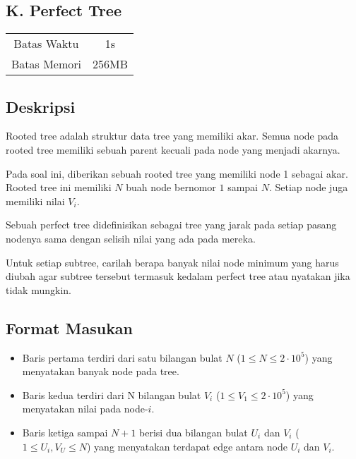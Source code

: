 \documentclass{article}
\begin{document}
\begin{center}
    \section*{K. Perfect Tree} %

    \begin{tabular}{ | c c | }
        \hline
        Batas Waktu  & 1s \\    %
        Batas Memori & 256MB \\  %
        \hline
    \end{tabular}
\end{center}

\subsection*{Deskripsi}

Rooted tree adalah struktur data tree yang memiliki akar. Semua node pada rooted tree memiliki sebuah parent kecuali pada node yang menjadi akarnya.

Pada soal ini, diberikan sebuah rooted tree yang memiliki node 1 sebagai akar. Rooted tree ini memiliki $N$ buah node bernomor $1$ sampai $N$. Setiap node juga memiliki nilai $V_i$.

Sebuah perfect tree didefinisikan sebagai tree yang jarak pada setiap pasang nodenya sama dengan selisih nilai yang ada pada mereka.

Untuk setiap subtree, carilah berapa banyak nilai node minimum yang harus diubah agar subtree tersebut termasuk kedalam perfect tree atau nyatakan jika tidak mungkin.


\subsection*{Format Masukan}

\begin{itemize}
    \item Baris pertama terdiri dari satu bilangan bulat $N$ ($1 \leq N \leq 2 \cdot 10^5$) yang menyatakan banyak node pada tree.
    \item Baris kedua terdiri dari N bilangan bulat $V_i$ ($1 \leq V_1 \leq 2 \cdot 10^5$) yang menyatakan nilai pada node-$i$.
    \item Baris ketiga sampai $N + 1$ berisi dua bilangan bulat $U_i$ dan $V_i$ ($1 \leq U_i, V_U \leq N$) yang menyatakan terdapat edge antara node $U_i$ dan $V_i$.
\end{itemize}
\end{document}
